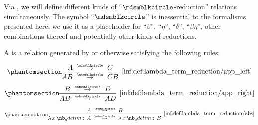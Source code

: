 \begin{definition}\label{def:lambda_term_reduction}
  Via , we will define different kinds of \enquote{\( {\Anon} \)-reduction} relations simultaneously. The symbol \enquote{\( {\Anon} \)} is inessential to the formalisms presented here; we use it as a placeholder for \enquote{\( \beta \)}, \enquote{\( \eta \)}, \enquote{\( \delta \)}, \enquote{\( \beta\eta \)}, other combinations thereof and potentially other kinds of reductions.

  \begin{thmenum}
     A  is a relation generated by or otherwise satisfying the following rules:
    \begin{paracol}{3}
      \begin{nthcolumn}{0}
        \ParacolAlignmentHack
        \begin{equation*}\taglabel[\ensuremath{ \logic{App}_{\Anon}^L }]{inf:def:lambda_term_reduction/app_left}
          \begin{prooftree}
            \hypo{ A \pred C }
            \infer1[\ref{inf:def:lambda_term_reduction/app_left}]{ AB \pred CB }
          \end{prooftree}
        \end{equation*}
      \end{nthcolumn}

      \begin{nthcolumn}{1}
        \ParacolAlignmentHack
        \begin{equation*}\taglabel[\ensuremath{ \logic{App}_{\Anon}^R }]{inf:def:lambda_term_reduction/app_right}
          \begin{prooftree}
            \hypo{ B \pred D }
            \infer1[\ref{inf:def:lambda_term_reduction/app_right}]{ AB \pred AD }
          \end{prooftree}
        \end{equation*}
      \end{nthcolumn}

      \begin{nthcolumn}{2}
        \ParacolAlignmentHack
        \begin{equation*}\taglabel[\ensuremath{ \logic{Abs}_{\Anon} }]{inf:def:lambda_term_reduction/abs}
          \begin{prooftree}
            \hypo{ A \pred B }
            \infer1[\ref{inf:def:lambda_term_reduction/abs}]{ \qabs x A \pred \qabs x B }
          \end{prooftree}
        \end{equation*}
      \end{nthcolumn}
    \end{paracol}


\end{thmenum}
\end{definition}
